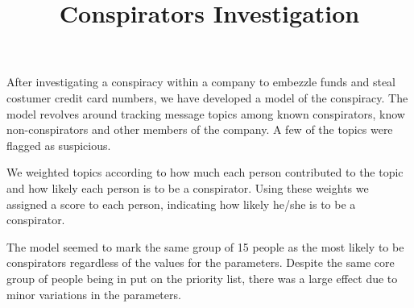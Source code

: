 \documentclass{icmmcm}
\title{Conspirators Investigation}
\begin{document}

\begin{summary}

After investigating a conspiracy within a company to embezzle
funds and steal costumer credit card numbers, we have developed
a model of the conspiracy.  The model revolves around tracking
message topics among known conspirators, know
non-conspirators and other members of the company.
A few of the topics were flagged as suspicious.

We weighted topics according to how much each person
contributed to the topic and how likely each person
is to be a conspirator.  Using these weights we assigned
a score to each person, indicating how likely he/she is
to be a conspirator. 

The model seemed to mark the same group of 15 people as
the most likely to be conspirators regardless of the values
for the parameters.  Despite the same core group of people
being in put on the priority list, there was a large effect
due to minor variations in the parameters.
\\\\


\end{summary}
\end{document}

